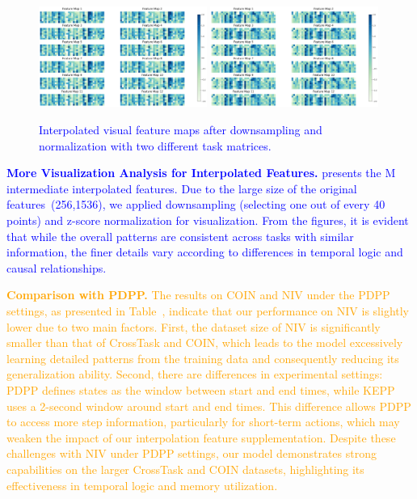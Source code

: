 \begin{figure}[htbp]
    \centering
    {\includegraphics[width=0.49\textwidth]{figures/feature_map1.png}\label{fig:fp1}}
    \hfill
    {\includegraphics[width=0.49\textwidth]{figures/feature_map2.png}\label{fig:fp2}}
    \caption{ \textcolor{blue}{Interpolated visual feature maps after downsampling and normalization with two different task matrices.} }
    \label{fig:fp}
\end{figure}



\textcolor{blue}{
\textbf{More Visualization Analysis for Interpolated Features.} 
 presents the M intermediate interpolated features. Due to the large size of the original features~(256,1536), we applied downsampling (selecting one out of every 40 points) and z-score normalization for visualization. From the figures, it is evident that while the overall patterns are consistent across tasks with similar information, the finer details vary according to differences in temporal logic and causal relationships.
}

\textcolor{orange}{
\textbf{Comparison with PDPP.} The results on COIN and NIV under the PDPP settings, as presented in Table~, indicate that our performance on NIV is slightly lower due to two main factors. First, the dataset size of NIV is significantly smaller than that of CrossTask and COIN, which leads to the model excessively learning detailed patterns from the training data and consequently reducing its generalization ability. Second, there are differences in experimental settings: PDPP defines states as the window between start and end times, while KEPP uses a 2-second window around start and end times. This difference allows PDPP to access more step information, particularly for short-term actions, which may weaken the impact of our interpolation feature supplementation. Despite these challenges with NIV under PDPP settings, our model demonstrates strong capabilities on the larger CrossTask and COIN datasets, highlighting its effectiveness in temporal logic and memory utilization.
}

